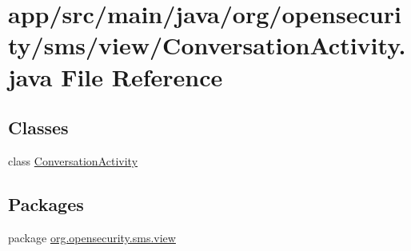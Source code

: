 \hypertarget{a00028}{\section{app/src/main/java/org/opensecurity/sms/view/\+Conversation\+Activity.java File Reference}
\label{a00028}
}
\subsection*{Classes}
\begin{DoxyCompactItemize}
\item 
class \hyperlink{a00007}{Conversation\+Activity}
\end{DoxyCompactItemize}
\subsection*{Packages}
\begin{DoxyCompactItemize}
\item 
package \hyperlink{a00040}{org.\+opensecurity.\+sms.\+view}
\end{DoxyCompactItemize}
